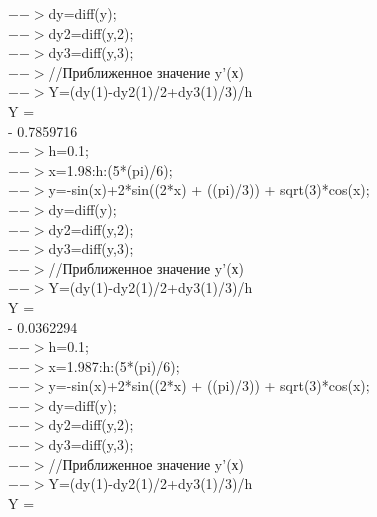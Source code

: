 \documentclass[russian,utf8,nocolumnxxxi,nocolumnxxxii]{eskdtext}
\begin{document}
  $-->$dy=diff(y);\\

  $-->$dy2=diff(y,2);\\

  $-->$dy3=diff(y,3);\\

  $-->$//Приближенное значение y’(х)\\

  $-->$Y=(dy(1)-dy2(1)/2+dy3(1)/3)/h\\
 Y  =\\

  - 0.7859716  \\

  $-->$h=0.1;\\

  $-->$x=1.98:h:(5*(pi)/6);\\

  $-->$y=-sin(x)+2*sin((2*x) + ((pi)/3)) + sqrt(3)*cos(x);\\

  $-->$dy=diff(y);\\

  $-->$dy2=diff(y,2);\\

  $-->$dy3=diff(y,3);\\

  $-->$//Приближенное значение y’(х)\\

  $-->$Y=(dy(1)-dy2(1)/2+dy3(1)/3)/h\\
 Y  =\\

  - 0.0362294  \\

  $-->$h=0.1;\\

  $-->$x=1.987:h:(5*(pi)/6);\\

  $-->$y=-sin(x)+2*sin((2*x) + ((pi)/3)) + sqrt(3)*cos(x);\\

  $-->$dy=diff(y);\\

  $-->$dy2=diff(y,2);\\

  $-->$dy3=diff(y,3);\\

  $-->$//Приближенное значение y’(х)\\

  $-->$Y=(dy(1)-dy2(1)/2+dy3(1)/3)/h\\
 Y  =\\
\end{document}
